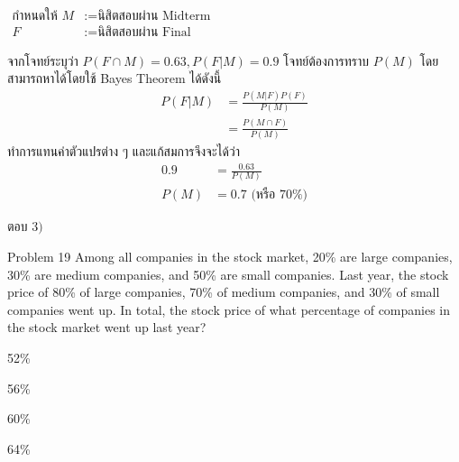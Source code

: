 \documentclass[11pt]{scrartcl}
\begin{document}
\begin{solutionbox}
  \begin{flushleft}
    $\begin{aligned}
      \text{กำหนดให้ } M &:= \text{นิสิตสอบผ่าน Midterm} \\
      F &:= \text{นิสิตสอบผ่าน Final}
    \end{aligned}$
  \end{flushleft}

  จากโจทย์ระบุว่า $P(F \cap M) = 0.63, P(F|M) = 0.9$ โจทย์ต้องการทราบ $P(M)$ โดยสามารถหาได้โดยใช้ Bayes Theorem ได้ดังนี้
  \begin{align*}
    P(F|M) &= \frac{P(M|F)P(F)}{P(M)} \\
    &= \frac{P(M \cap F)}{P(M)}
  \end{align*}
  ทำการแทนค่าตัวแปรต่าง ๆ และแก้สมการจึงจะได้ว่า
  \begin{align*}
      0.9  &= \frac{0.63}{P(M)} \\
      P(M) &= 0.7 \text{ (หรือ 70\%)}
  \end{align*}

  ตอบ $\boxed{3)}$
\end{solutionbox}

\newpage

\begin{problembox}{Problem 19}
  Among all companies in the stock market, 20\% are large companies, 30\% are medium companies, and 50\% are small companies. Last year, the stock price of 80\% of large companies, 70\% of medium companies, and 30\% of small companies went up. In total, the stock price of what percentage of companies in the stock market went up last year?
  
  \begin{choices}
  \item 52\%
  \item 56\%
  \item 60\%
  \item 64\%
  \end{choices}
\end{problembox}
\end{document}
